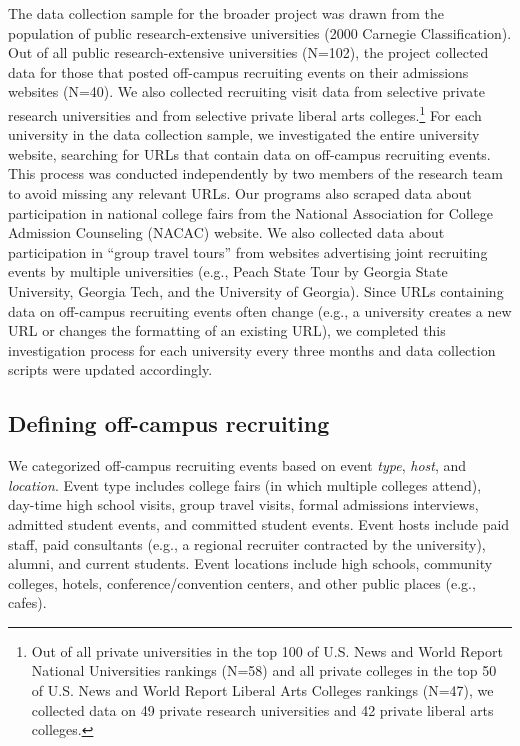 \documentclass[twoside]{article}
\begin{document}
The data collection sample for the broader project was drawn from the population of public research-extensive universities (2000 Carnegie Classification). Out of all public research-extensive universities (N=102), the project collected data for those that posted off-campus recruiting events on their admissions websites (N=40). We also collected recruiting visit data from selective private research universities and from selective private liberal arts colleges.\footnote{Out of all private universities in the top 100 of U.S. News and World Report National Universities rankings (N=58) and all private colleges in the top 50 of U.S. News and World Report Liberal Arts Colleges rankings (N=47), we collected data on 49 private research universities and 42 private liberal arts colleges.} For each university in the data collection sample, we investigated the entire university website, searching for URLs that contain data on off-campus recruiting events. This process was conducted independently by two members of the research team to avoid missing any relevant URLs. Our programs also scraped data about participation in national college fairs from the National Association for College Admission Counseling (NACAC) website. We also collected data about participation in ``group travel tours'' from websites advertising joint recruiting events by multiple universities (e.g., Peach State Tour by Georgia State University, Georgia Tech, and the University of Georgia). Since URLs containing data on off-campus recruiting events often change (e.g., a university creates a new URL or changes the formatting of an existing URL),  we completed this investigation process for each university every three months and data collection scripts were updated accordingly.

\subsection*{Defining off-campus recruiting}

We categorized off-campus recruiting events based on event \textit{type}, \textit{host}, and \textit{location}. Event type includes college fairs (in which multiple colleges attend), day-time high school visits, group travel visits, formal admissions interviews, admitted student events, and committed student events. Event hosts include paid staff, paid consultants (e.g., a regional recruiter contracted by the university), alumni, and current students. Event locations include high schools, community colleges, hotels, conference/convention centers, and other public places (e.g., cafes).
\end{document}
